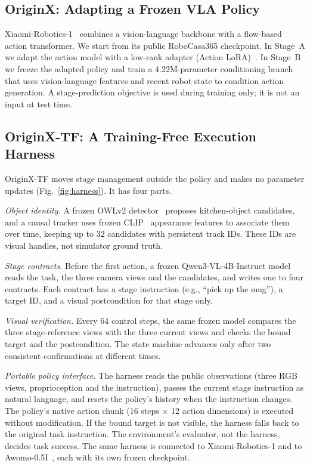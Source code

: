 \documentclass[conference]{IEEEtran}
\begin{document}
\subsection{OriginX: Adapting a Frozen VLA Policy}
Xiaomi-Robotics-1~\cite{xiaomi2026robotics1} combines a vision-language backbone with a flow-based action transformer. We start from its public RoboCasa365 checkpoint. In Stage~A we adapt the action model with a low-rank adapter (Action LoRA)~\cite{hu2022lora}. In Stage~B we freeze the adapted policy and train a 4.22M-parameter conditioning branch that uses vision-language features and recent robot state to condition action generation. A stage-prediction objective is used during training only; it is not an input at test time.

\subsection{OriginX-TF: A Training-Free Execution Harness}
OriginX-TF moves stage management outside the policy and makes no parameter updates (Fig.~\ref{fig:harness}). It has four parts.

\emph{Object identity.} A frozen OWLv2 detector~\cite{minderer2023owlv2} proposes kitchen-object candidates, and a causal tracker uses frozen CLIP~\cite{radford2021clip} appearance features to associate them over time, keeping up to 32 candidates with persistent track IDs. These IDs are visual handles, not simulator ground truth.

\emph{Stage contracts.} Before the first action, a frozen Qwen3-VL-4B-Instruct model~\cite{qwen3vl4b} reads the task, the three camera views and the candidates, and writes one to four contracts. Each contract has a stage instruction (e.g., ``pick up the mug''), a target ID, and a visual postcondition for that stage only.

\emph{Visual verification.} Every 64 control steps, the same frozen model compares the three stage-reference views with the three current views and checks the bound target and the postcondition. The state machine advances only after two consistent confirmations at different times.

\emph{Portable policy interface.} The harness reads the public observations (three RGB views, proprioception and the instruction), passes the current stage instruction as natural language, and resets the policy's history when the instruction changes. The policy's native action chunk (16 steps $\times$ 12 action dimensions) is executed without modification. If the bound target is not visible, the harness falls back to the original task instruction. The environment's evaluator, not the harness, decides task success. The same harness is connected to Xiaomi-Robotics-1 and to Awomo-0.5I~\cite{awomo2026}, each with its own frozen checkpoint.
\end{document}
